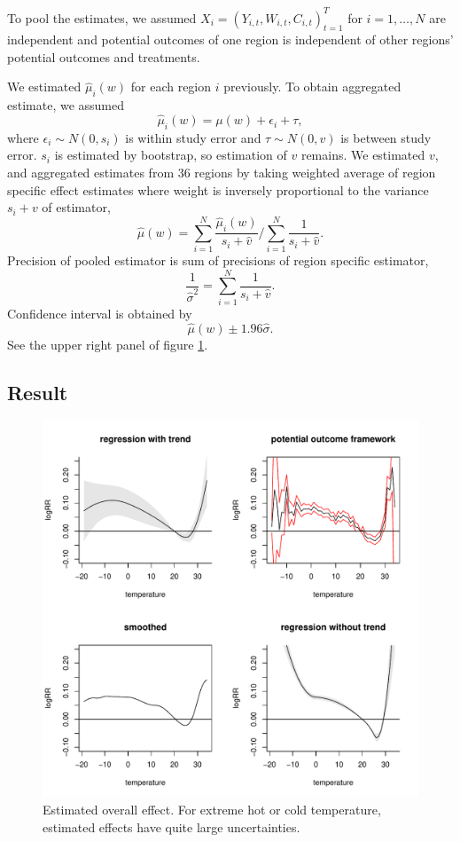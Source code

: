 \documentclass[12pt]{article}
\begin{document}
To pool the estimates,
we assumed $X_i = (Y_{i,t}, W_{i,t}, C_{i,t})_{t = 1}^T$ for $i = 1, \dots, N$ are independent
and potential outcomes of one region is independent of other regions' potential outcomes and treatments.

We estimated $\hat{\mu}_i(w)$ for each region $i$ previously.
To obtain aggregated estimate, we assumed
\[
	\hat{\mu}_i(w) = \mu(w) + \epsilon_i + \tau,
\]
where $\epsilon_i \sim N(0, s_i)$ is within study error and $\tau \sim N(0, v)$ is between study error.
$s_i$ is estimated by bootstrap,
so estimation of $v$ remains.
We estimated $v$, and aggregated estimates from 36 regions
by taking weighted average of region specific effect estimates
where weight is inversely proportional to the variance $s_i + v$ of estimator,
\[
	\hat{\mu}(w) = \sum_{i = 1}^N \frac{\hat{\mu}_i(w)}{s_i + \hat{v}}
	/\sum_{i = 1}^N \frac{1}{s_i + \hat{v}}.
\]
Precision of pooled estimator is sum of precisions of region specific estimator,
\[
	\frac{1}{\hat{\sigma}^2} = \sum_{i = 1}^N \frac{1}{s_i + \hat{v}}.
\]
Confidence interval is obtained by 
\[
	\hat{\mu}(w) \pm 1.96 \hat{\sigma}.
\]
See the upper right panel of figure \ref{figure:main}.


\subsection{Result}

\begin{figure}
	\includegraphics[width = \textwidth]{figures/main1.pdf}
	\caption{Estimated overall effect. 
	For extreme hot or cold temperature, estimated effects have quite large uncertainties.}
	\label{figure:main}
\end{figure}
\end{document}

